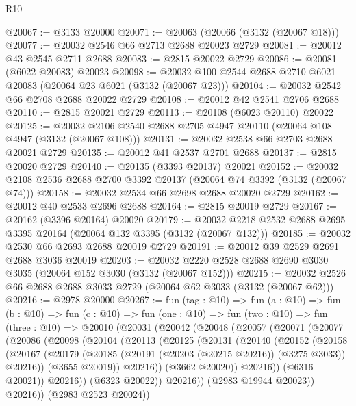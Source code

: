 \begin{lexlean}{R10}
\begin{coremodule}
@20067 := @3133 @20000
@20071 := @20063 (@20066 (@3132 (@20067 @18)))
@20077 := @20032 @2546 @66 @2713 @2688 @20023 @2729
@20081 := @20012 @43 @2545 @2711 @2688
@20083 := @2815 @20022 @2729
@20086 := @20081 (@6022 @20083) @20023
@20098 := @20032 @100 @2544 @2688 @2710 @6021 @20083 (@20064 @23 @6021 (@3132 (@20067 @23)))
@20104 := @20032 @2542 @66 @2708 @2688 @20022 @2729
@20108 := @20012 @42 @2541 @2706 @2688
@20110 := @2815 @20021 @2729
@20113 := @20108 (@6023 @20110) @20022
@20125 := @20032 @2106 @2540 @2688 @2705 @4947 @20110 (@20064 @108 @4947 (@3132 (@20067 @108)))
@20131 := @20032 @2538 @66 @2703 @2688 @20021 @2729
@20135 := @20012 @41 @2537 @2701 @2688
@20137 := @2815 @20020 @2729
@20140 := @20135 (@3393 @20137) @20021
@20152 := @20032 @2108 @2536 @2688 @2700 @3392 @20137 (@20064 @74 @3392 (@3132 (@20067 @74)))
@20158 := @20032 @2534 @66 @2698 @2688 @20020 @2729
@20162 := @20012 @40 @2533 @2696 @2688
@20164 := @2815 @20019 @2729
@20167 := @20162 (@3396 @20164) @20020
@20179 := @20032 @2218 @2532 @2688 @2695 @3395 @20164 (@20064 @132 @3395 (@3132 (@20067 @132)))
@20185 := @20032 @2530 @66 @2693 @2688 @20019 @2729
@20191 := @20012 @39 @2529 @2691 @2688 @3036 @20019
@20203 := @20032 @2220 @2528 @2688 @2690 @3030 @3035 (@20064 @152 @3030 (@3132 (@20067 @152)))
@20215 := @20032 @2526 @66 @2688 @2688 @3033 @2729 (@20064 @62 @3033 (@3132 (@20067 @62)))
@20216 := @2978 @20000
@20267 := fun (tag : @10) =>
  fun (a : @10) =>
  fun (b : @10) =>
  fun (c : @10) =>
  fun (one : @10) =>
  fun (two : @10) =>
  fun (three : @10) =>
  @20010
    (@20031
      (@20042
        (@20048
          (@20057
            (@20071
              (@20077
                (@20086
                  (@20098
                    (@20104
                      (@20113
                        (@20125
                          (@20131
                            (@20140
                              (@20152
                                (@20158
                                  (@20167
                                    (@20179
                                      (@20185
                                        (@20191 (@20203 (@20215 @20216)) (@3275 @3033))
                                        @20216))
                                    (@3655 @20019))
                                  @20216))
                              (@3662 @20020))
                            @20216))
                        (@6316 @20021))
                      @20216))
                  (@6323 @20022))
                @20216))
            (@2983 @19944 @20023))
          @20216))
      (@2983 @2523 @20024))

\end{coremodule}
\end{lexlean}
